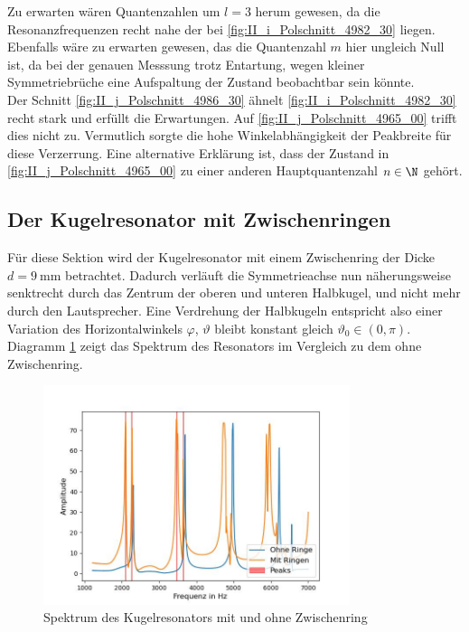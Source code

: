 \documentclass[../main.tex]{subfiles}
\begin{document}
    Zu erwarten wären Quantenzahlen um $l=3$ herum gewesen, da die Resonanzfrequenzen recht nahe der bei \ref{fig:II_i_Polschnitt_4982_30} liegen. Ebenfalls wäre zu erwarten gewesen, das die Quantenzahl $m$ hier ungleich Null ist, da bei der genauen Messsung trotz Entartung, wegen kleiner Symmetriebrüche eine Aufspaltung der Zustand beobachtbar sein könnte.\\

    Der Schnitt \ref{fig:II_j_Polschnitt_4986_30} ähnelt \ref{fig:II_i_Polschnitt_4982_30} recht stark und erfüllt die Erwartungen. Auf \ref{fig:II_j_Polschnitt_4965_00} trifft dies nicht zu. Vermutlich sorgte die hohe Winkelabhängigkeit der Peakbreite für diese Verzerrung. Eine alternative Erklärung ist, dass der Zustand in \ref{fig:II_j_Polschnitt_4965_00} zu einer anderen Hauptquantenzahl $n\in\N$ gehört.

\subsection{Der Kugelresonator mit Zwischenringen}        
    Für diese Sektion wird der Kugelresonator mit einem Zwischenring der Dicke $d=\SI{9}{\milli\metre}$ betrachtet. Dadurch verläuft die Symmetrieachse nun näherungsweise senktrecht durch das Zentrum der oberen und unteren Halbkugel, und nicht mehr durch den Lautsprecher. Eine Verdrehung der Halbkugeln entspricht also einer Variation des Horizontalwinkels $\varphi$, $\vartheta$ bleibt konstant gleich $\vartheta_0\in(0,\pi)$. Diagramm \ref{fig:III_l_Vergleichspektrum} zeigt das Spektrum des Resonators im Vergleich zu dem ohne Zwischenring.

    \begin{figure}[H]
        \centering
        \includegraphics[width=0.8\textwidth]{Bilddateien/Auswertung/III_l_Vergleichspektrum.jpg}
        \caption{Spektrum des Kugelresonators mit und ohne Zwischenring}
        \label{fig:III_l_Vergleichspektrum}
    \end{figure}
\end{document}
